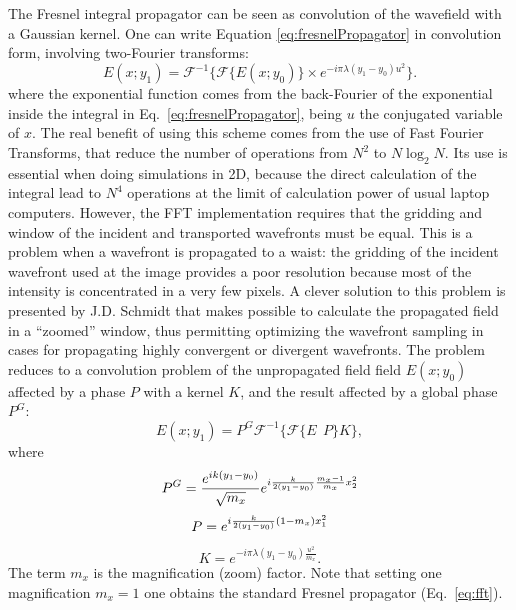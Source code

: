 \documentclass{iucr}              %
\begin{document}
The Fresnel integral propagator can be seen as convolution of the wavefield with a Gaussian kernel. 
One can write Equation \ref{eq:fresnelPropagator} in convolution form, involving two-Fourier transforms:
\begin{equation}\label{eq:fft}
E(x; y_1) = \mathcal{F}^{-1}\Big\{ \mathcal{F}\{E(x; y_0)\} \times e^{-i \pi \lambda (y_1-y_0) u^2} \Big\}.
\end{equation} 
where the exponential function comes from the back-Fourier of the exponential inside the integral in Eq.~\ref{eq:fresnelPropagator}, being $u$ the conjugated variable of $x$. 
The real benefit of using this scheme comes from the use of Fast Fourier Transforms, that reduce the number of operations from $N^2$ to $N \log_2 N$. Its use is essential when doing simulations in 2D, because the direct calculation of the integral lead to $N^4$ operations at the limit of calculation power of usual laptop computers. However, the FFT implementation requires that the gridding and window of the incident and transported wavefronts must be equal. This is a problem when a wavefront is propagated to a waist: the gridding of the incident wavefront used at the image provides a poor resolution because most of the intensity is concentrated in a very few pixels. A clever solution to this problem is presented by J.D. Schmidt \cite{schmidt} that makes possible to calculate the propagated field in a ``zoomed'' window, thus permitting optimizing the wavefront sampling in cases for propagating highly convergent or divergent wavefronts. The problem reduces to a convolution problem of the unpropagated field field $E(x;y_0)$ affected by a phase $P$ with a kernel $K$, and the result affected by a global phase $P^G$: 
\begin{equation}
E(x; y_1) = P^G \mathcal{F}^{-1} \Big\{ \mathcal{F} \big\{ E~~P \big\} K \Big\},
\end{equation}
where
\begin{equation}
P^G =  \frac { e^{ik(y_1-y_0) }}{\sqrt{m_x} }e^{i \frac{k}{2 (y_1-y_0)} \frac{m_x - 1}{m_x}x_2^2}  \\
\end{equation}
\begin{equation}
P = e^{i \frac{k}{2(y_1-y_0)} (1-m_x)x_1^2 } \\
\end{equation}
\begin{equation}
K = e^{-i \pi \lambda (y_1-y_0) \frac{u^2}{m_x} }.
\end{equation}
The term $m_x$ is the magnification (zoom) factor. 
Note that setting one magnification $m_x=1$ one obtains the standard Fresnel propagator (Eq.~\ref{eq:fft}).
\end{document}
